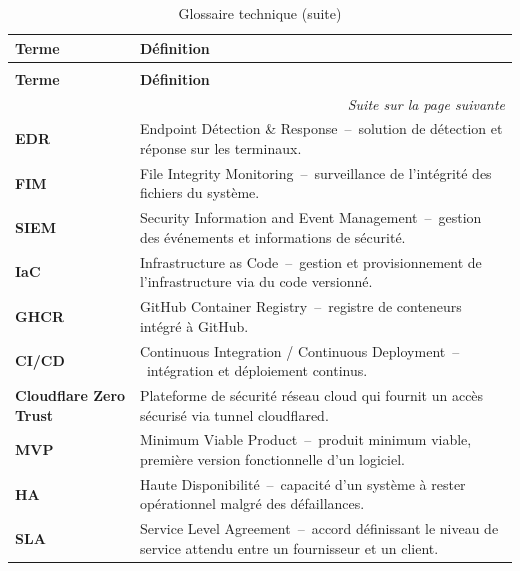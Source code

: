 \begin{longtable}{lp{10cm}}
  \caption{Glossaire technique}
  \label{tab:glossaire} \\
  \toprule
  \textbf{Terme} & \textbf{Définition} \\
  \midrule
  \endfirsthead

  \caption{Glossaire technique (suite)} \\
  \toprule
  \textbf{Terme} & \textbf{Définition} \\
  \midrule
  \endhead

  \midrule
  \multicolumn{2}{r}{\small\textit{Suite sur la page suivante}} \\
  \endfoot

  \bottomrule
  \endlastfoot

  \textbf{EDR}
  & Endpoint Détection \& Response~--~solution de détection et réponse sur
  les terminaux. \\

  \textbf{FIM}
  & File Integrity Monitoring~--~surveillance de l'intégrité des fichiers
  du système. \\

  \textbf{SIEM}
  & Security Information and Event Management~--~gestion des événements et
  informations de sécurité. \\

  \textbf{IaC}
  & Infrastructure as Code~--~gestion et provisionnement de
  l'infrastructure via du code versionné. \\

  \textbf{GHCR}
  & GitHub Container Registry~--~registre de conteneurs intégré à GitHub. \\

  \textbf{CI/CD}
  & Continuous Integration / Continuous Deployment~--~intégration et
  déploiement continus. \\

  \textbf{Cloudflare Zero Trust}
  & Plateforme de sécurité réseau cloud qui fournit un accès sécurisé
  via tunnel cloudflared. \\

  \textbf{MVP}
  & Minimum Viable Product~--~produit minimum viable, première version
  fonctionnelle d'un logiciel. \\

  \textbf{HA}
  & Haute Disponibilité~--~capacité d'un système à rester opérationnel
  malgré des défaillances. \\

  \textbf{SLA}
  & Service Level Agreement~--~accord définissant le niveau de service
  attendu entre un fournisseur et un client. \\


\end{longtable}
